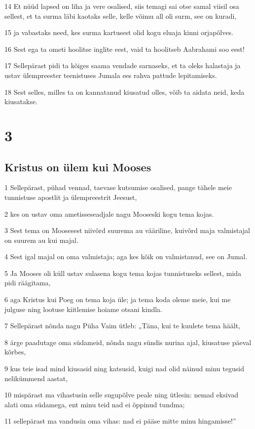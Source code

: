 \par 14 Et nüüd lapsed on liha ja vere osalised, siis temagi sai otse samal viisil osa sellest, et ta surma läbi kaotaks selle, kelle võimu all oli surm, see on kuradi,
\par 15 ja vabastaks need, kes surma kartusest olid kogu eluaja kinni orjapõlves.
\par 16 Sest ega ta ometi hoolitse inglite eest, vaid ta hoolitseb Aabrahami soo eest!
\par 17 Sellepärast pidi ta kõiges saama vendade sarnaseks, et ta oleks halastaja ja ustav ülempreester teenistuses Jumala ees rahva pattude lepitamiseks.
\par 18 Sest selles, milles ta on kannatanud kiusatud olles, võib ta aidata neid, keda kiusatakse.


\chapter{3}

\section*{Kristus on ülem kui Mooses}

\par 1 Sellepärast, pühad vennad, taevase kutsumise osalised, pange tähele meie tunnistuse apostlit ja ülempreestrit Jeesust,
\par 2 kes on ustav oma ametisseseadjale nagu Mooseski kogu tema kojas.
\par 3 Sest tema on Moosesest niivõrd suurema au vääriline, kuivõrd maja valmistajal on suurem au kui majal.
\par 4 Sest igal majal on oma valmistaja; aga kes kõik on valmistanud, see on Jumal.
\par 5 Ja Mooses oli küll ustav sulasena kogu tema kojas tunnistuseks sellest, mida pidi räägitama,
\par 6 aga Kristus kui Poeg on tema koja üle; ja tema koda oleme meie, kui me julguse ning lootuse kiitlemise hoiame otsani kindla.
\par 7 Sellepärast nõnda nagu Püha Vaim ütleb: „Täna, kui te kuulete tema häält,
\par 8 ärge paadutage oma südameid, nõnda nagu sündis nurina ajal, kiusatuse päeval kõrbes,
\par 9 kus teie isad mind kiusasid ning katsusid, kuigi nad olid näinud minu tegusid nelikümmend aastat,
\par 10 mispärast ma vihastusin selle sugupõlve peale ning ütlesin: nemad eksivad alati oma südamega, ent minu teid nad ei õppinud tundma;
\par 11 sellepärast ma vandusin oma vihas: nad ei pääse mitte minu hingamisse!”

